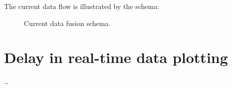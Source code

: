 The current data flow is illustrated by the schema:
\bigbreak

\begin{center}
	\begin{figure}[ht!]
		\caption{Current data fusion schema.}
	\end{figure}
\end{center}

\section{Delay in real-time data plotting}
\dots

